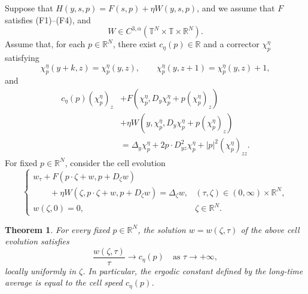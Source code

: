 \documentclass[preprint]{elsarticle}
\newtheorem{result}{\textbf{Theorem}}
\numberwithin{equation}{section}
\begin{document}
Suppose that $H(y,s,p)=F(s,p)+\eta W(y,s,p)$, and we assume that $F$ satisfies \textup{(F1)}--\textup{(F4)}, and
$$
W\in C^{3,\alpha}(\mathbb T^N\times\mathbb T\times\mathbb R^N).
$$
Assume that, for each $p\in\mathbb R^N$, there exist $c_\eta(p)\in\mathbb R$ and a corrector $\chi_p^\eta$ satisfying
\[
\chi_p^\eta(y+k,z)=\chi_p^\eta(y,z),
\qquad
\chi_p^\eta(y,z+1)=\chi_p^\eta(y,z)+1,
\]
and
\begin{equation*}
\begin{aligned}
c_\eta(p)(\chi_p^\eta)_z
&+
F\left(\chi_p^\eta,D_y\chi_p^\eta+p(\chi_p^\eta)_z\right)
\\
&+
\eta W\left(y,\chi_p^\eta,D_y\chi_p^\eta+p(\chi_p^\eta)_z\right)
\\
&=
\Delta_y\chi_p^\eta
+
2p\cdot D^2_{yz}\chi_p^\eta
+
|p|^2(\chi_p^\eta)_{zz}.
\end{aligned}
\end{equation*}
For fixed $p\in\mathbb R^N$, consider the cell evolution
\begin{equation*}
\begin{cases}
w_\tau
+
F\left(p\cdot \zeta+w,p+D_\zeta w\right)
\\
\qquad
+
\eta W\left(\zeta,p\cdot \zeta+w,p+D_\zeta w\right)
=
\Delta_\zeta w,
&(\tau,\zeta)\in(0,\infty)\times\mathbb R^N,
\\[1mm]
w(\zeta,0)=0,
&\zeta\in\mathbb R^N.
\end{cases}
\end{equation*}

\begin{result}
For every fixed $p\in\mathbb R^N$, the solution $w=w(\zeta,\tau)$ of the above cell evolution satisfies
\begin{equation*}
\frac{w(\zeta,\tau)}{\tau}\to c_\eta(p)
\quad\text{as }\tau\to+\infty,
\end{equation*}
locally uniformly in $\zeta$. In particular, the ergodic constant defined by the long-time average is equal to the cell speed $c_\eta(p)$.
\end{result}
\end{document}
